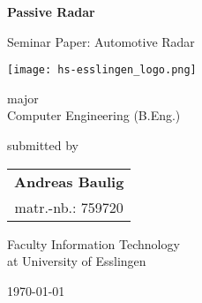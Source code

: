 \begin{titlepage}
    \begin{center}
        \vspace*{1cm}
        \Huge
        \textbf{Passive Radar}

        \vspace{0.5cm}

        \LARGE
        Seminar Paper: Automotive Radar

        \texttt{[image: hs-esslingen\_logo.png]}

        \large
        major \\
        \Large
        Computer Engineering (B.Eng.)

        \vspace{0.25cm}

        \large
        submitted by

        \vspace{0.25cm}

        \Large
        \begin{tabular}{c}
            \textbf{Andreas Baulig} \\
            matr.-nb.: 759720
        \end{tabular}

        \vspace{0.5cm}

        Faculty Information Technology \\
        at University of Esslingen

        \vfill

        \today

    \end{center}
\end{titlepage}
